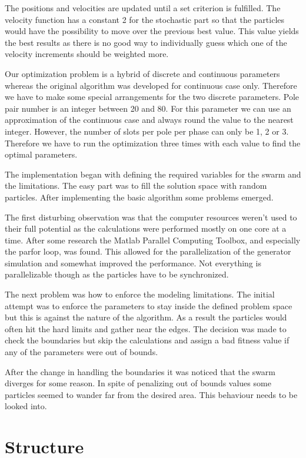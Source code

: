 \documentclass[twoside]{article}
\begin{document}
\begin{multicols}{2}
The positions and velocities are updated until a set criterion is fulfilled. The velocity function has a constant 2 for the stochastic part so that the particles would have the possibility to move over the previous best value. This value yields the best results as there is no good way to individually guess which one of the velocity increments should be weighted more. \cite{pso} 

Our optimization problem is a hybrid of discrete and continuous parameters whereas the original algorithm was developed for continuous case only. Therefore we have to make some special arrangements for the two discrete parameters. Pole pair number is an integer between 20 and 80. For this parameter we can use an approximation of the continuous case and always round the value to the nearest integer. However, the number of slots per pole per phase can only be 1, 2 or 3. Therefore we have to run the optimization three times with each value to find the optimal parameters.

The implementation began with defining the required variables for the swarm and the limitations. The easy part was to fill the solution space with random particles. After implementing the basic algorithm some problems emerged.

The first disturbing observation was that the computer resources weren't used to their full potential as the calculations were performed mostly on one core at a time. After some research the Matlab Parallel Computing Toolbox, and especially the parfor loop, was found. This allowed for the parallelization of the generator simulation and somewhat improved the performance. Not everything is parallelizable though as the particles have to be synchronized. 

The next problem was how to enforce the modeling limitations. The initial attempt was to enforce the parameters to stay inside the defined problem space but this is against the nature of the algorithm. As a result the particles would often hit the hard limits and gather near the edges. The decision was made to check the boundaries but skip the calculations and assign a bad fitness value if any of the parameters were out of bounds.

After the change in handling the boundaries it was noticed that the swarm diverges for some reason. In spite of penalizing out of bounds values some particles seemed to wander far from the desired area. This behaviour needs to be looked into.

\section{Structure}


\end{multicols}
\end{document}
